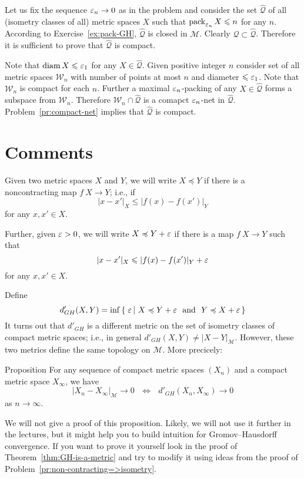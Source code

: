 Let us fix the sequence $\varepsilon_n\to 0$ as in the problem and consider the set $\hat{\mathcal{Q}}$ of all (isometry classes of all) metric spaces $X$ such that
$\operatorname{pack}_{\varepsilon_n} X\leqslant n$ for any $n$. 
According to Exercise~\ref{ex:pack-GH}, $\hat{\mathcal{Q}}$ is closed in $\mathcal{M}$.
Clearly $\mathcal{Q}\subset\hat{\mathcal{Q}}$.
Therefore it is sufficient to prove that $\hat{\mathcal{Q}}$ is compact.

Note that $\operatorname{diam} X\leqslant \varepsilon_1$ for any $X\in \hat{\mathcal{Q}}$.
Given positive integer $n$ consider set of all metric spaces $\mathcal{W}_n$
with number of points at most $n$ and diameter $\leqslant \varepsilon_1$.
Note that $\mathcal{W}_n$ is compact for each $n$.
Further a maximal $\varepsilon_n$-packing of any $X\in\hat{\mathcal{Q}}$ forms a subspace from $\mathcal{W}_n$.
Therefore $\mathcal{W}_n\cap\hat{\mathcal{Q}}$ is a comapct $\varepsilon_n$-net in  $\hat{\mathcal{Q}}$.
Problem~\ref{pr:compact-net} implies that $\hat{\mathcal{Q}}$ is compact.
\qeds



\section{Comments} 

Given two metric spaces $X$ and $Y$, we will write $X\preccurlyeq Y$ if there is a noncontracting map $f\:X\to Y$;
i.e., if 
$$ |x-x'|_X\le|f(x)-f(x')|_Y$$
for any $x,x'\in X$.

Further, given $\varepsilon>0$, we will write $X\preccurlyeq Y+\varepsilon$
if there is a map $f\:X\to Y$ such that 
$$|x-x'|_X\leqslant|f(x)-f(x')|_Y+\varepsilon$$
for any $x,x'\in X$.

Define 
$$d'_{GH}(X,Y)=\inf\set{\eps}{X\preccurlyeq Y+\eps\ \ \text{and}\ \ Y\preccurlyeq X+\eps}$$
It turns out that $d'_{GH}$ is a different metric on the set of isometry classes of compact metric spaces; i.e., in general $d'_{GH}(X,Y)\not=|X-Y|_{\mathcal{M}}$. 
However, these two metrics define the same topology on $\mathcal{M}$.
More precicely:

\begin{thm}{Proposition}\label{GH-po}
For any sequence of compact metric spaces $(X_n)$ and a compact metric space $X_\infty$,
we have
$$|X_n-X_\infty|_{\mathcal{M}}\to 0 \ \ \ \Leftrightarrow\ \ \ d'_{GH}(X_n,X_\infty)\to 0$$ 
as $n\to\infty$.
\end{thm}

We will not give a proof of this proposition. 
Likely, we will not use it further in the lectures, 
but it might help you to build intuition for Gromov--Hausdorff convergence.
If you want to prove it yourself look in the proof of Theorem~\ref{thm:GH-is-a-metric} 
and try to modify it using ideas from the proof of Problem~\ref{pr:non-contracting=>isometry}.

